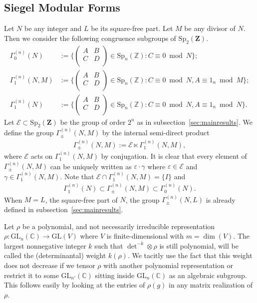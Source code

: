 \documentclass[11pt]{amsart}
\numberwithin{equation}{section}
\newcommand{\mbb}{\mathbb}
\newcommand{\mc}{\mathcal}
\newcommand{\mf}{\mathbf}
\newcommand{\mrm}{\mathrm} %
\newcommand{\smat}[4]{\left( \begin{smallmatrix} #1 & #2 \\ #3 & #4 \\ \end{smallmatrix} \right)}
\newcommand{\sptwo}{\mrm{Sp}_2( \mf Z)}
\begin{document}
\subsection{Siegel Modular Forms} \label{prelim-smf} 
Let $N$ be any integer and $L$ be its square-free part. Let $M$ be any divisor of $N$. Then we consider the following congruence subgroups of $\sptwo$.
\begin{align}
    \Gamma_0^{(n)}(N)&:=\{\smat{A}{B}{C}{D}\in\mrm{Sp}_n(\mbb Z): C\equiv 0\bmod N\};\\
\Gamma_1^{(n)}(N, M)&:= \{\smat{A}{B}{C}{D}\in\mrm{Sp}_n(\mbb Z): C\equiv 0\bmod N, A\equiv 1_n\bmod M  \};\\
\Gamma_1^{(n)}(N)&:= \{\smat{A}{B}{C}{D}\in\mrm{Sp}_n(\mbb Z): C\equiv 0\bmod N, A\equiv 1_n\bmod N \}.
\end{align}
Let $\mc E \subset\sptwo$ be the group of order $2^n$ as in subsection~\ref{sec:mainresults}. %
We define the group $\Gamma_\pm^{(n)}(N,M)$ by the internal semi-direct product 
\begin{align}
   \Gamma_\pm^{(n)}(N,M):= \mc E \ltimes \Gamma_1^{(n)}(N,M),
\end{align}
where $\mc E$ acts on $\Gamma_1^{(n)}(N,M)$ by conjugation. It is clear that every element of $\Gamma_\pm^{(n)}(N,M)$ can be uniquely written as $\varepsilon \cdot \gamma$ where $\varepsilon \in \mc E$ and $\gamma \in \Gamma_1^{(n)}(N,M)$. Note that $\mc E \cap \Gamma_1^{(n)}(N,M)=\{I\}$ and
\begin{align}
   \Gamma_1^{(n)}(N)\subset\Gamma_{\pm}^{(n)}(N,M)\subset \Gamma_0^{(n)}(N). 
\end{align}
When $M=L$, the square-free part of $N$, the group $\Gamma_\pm^{(n)}(N,L)$ is already defined in subsection~\ref{sec:mainresults}.

Let $\rho$ be a polynomial, and not necessarily irreducible representation $\rho \colon \mrm{GL}_n(\mbb C)\rightarrow \mrm{GL}(V)$ where $V$ is finite-dimensional with $m=\dim(V)$. The largest nonnegative integer $k$ such that $\det^{-k}\otimes \rho$ is
still polynomial, will be called the (determinantal) weight $k(\rho)$. We tacitly use the fact that this weight does not decrease if we tensor $\rho$
with another polynomial representation or restrict it to some 
$\mrm{GL}_{n'}(\mbb C)$ sitting inside $\mrm{GL}_{n}(\mbb C)$ as an algebraic  subgroup. This follows easily by looking at the entries of $\rho(g)$ in any matrix realization of $\rho$.
\end{document}
